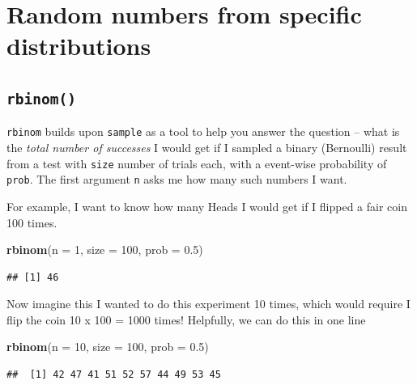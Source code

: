 \documentclass[]{book}
\newenvironment{Shaded}{\begin{snugshade}}{\end{snugshade}}
\newcommand{\DataTypeTok}[1]{\textcolor[rgb]{0.13,0.29,0.53}{#1}}
\newcommand{\DecValTok}[1]{\textcolor[rgb]{0.00,0.00,0.81}{#1}}
\newcommand{\FloatTok}[1]{\textcolor[rgb]{0.00,0.00,0.81}{#1}}
\newcommand{\KeywordTok}[1]{\textcolor[rgb]{0.13,0.29,0.53}{\textbf{#1}}}
\newcommand{\NormalTok}[1]{#1}
\theoremstyle{definition}
\theoremstyle{definition}
\theoremstyle{definition}
\theoremstyle{remark}
\begin{document}
\hypertarget{random-numbers-from-specific-distributions}{%
\section{Random numbers from specific distributions}\label{random-numbers-from-specific-distributions}}

\hypertarget{rbinom}{%
\subsection*{\texorpdfstring{\texttt{rbinom()}}{rbinom()}}\label{rbinom}}

\texttt{rbinom} builds upon \texttt{sample} as a tool to help you answer the question -- what is the \emph{total number of successes} I would get if I sampled a binary (Bernoulli) result from a test with \texttt{size} number of trials each, with a event-wise probability of \texttt{prob}. The first argument \texttt{n} asks me how many such numbers I want.

For example, I want to know how many Heads I would get if I flipped a fair coin 100 times.

\begin{Shaded}
\begin{Highlighting}[]
\KeywordTok{rbinom}\NormalTok{(}\DataTypeTok{n =} \DecValTok{1}\NormalTok{, }\DataTypeTok{size =} \DecValTok{100}\NormalTok{, }\DataTypeTok{prob =} \FloatTok{0.5}\NormalTok{)}
\end{Highlighting}
\end{Shaded}

\begin{verbatim}
## [1] 46
\end{verbatim}

Now imagine this I wanted to do this experiment 10 times, which would require I flip the coin 10 x 100 = 1000 times! Helpfully, we can do this in one line

\begin{Shaded}
\begin{Highlighting}[]
\KeywordTok{rbinom}\NormalTok{(}\DataTypeTok{n =} \DecValTok{10}\NormalTok{, }\DataTypeTok{size =} \DecValTok{100}\NormalTok{, }\DataTypeTok{prob =} \FloatTok{0.5}\NormalTok{)}
\end{Highlighting}
\end{Shaded}

\begin{verbatim}
##  [1] 42 47 41 51 52 57 44 49 53 45
\end{verbatim}
\end{document}
